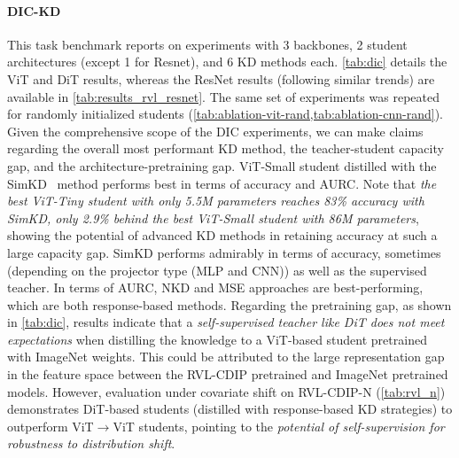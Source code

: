 \documentclass[runningheads]{llncs}
\begin{document}
\paragraph{DIC-KD} This task benchmark reports on experiments with 3 backbones, 2 student architectures (except 1 for Resnet), and 6 KD methods each. \cref{tab:dic} details the ViT and DiT results, whereas the ResNet results (following similar trends) are available in \cref{tab:results_rvl_resnet}.
The same set of experiments was repeated for randomly initialized students (\cref{tab:ablation-vit-rand,tab:ablation-cnn-rand}).
Given the comprehensive scope of the DIC experiments, we can make claims regarding the overall most performant KD method, the teacher-student capacity gap, and the architecture-pretraining gap.
ViT-Small student distilled with the SimKD~\cite{SimKD} method performs best in terms of accuracy and AURC. Note that \textit{the best ViT-Tiny student with only 5.5M parameters reaches 83\% accuracy with SimKD, only 2.9\% behind the best ViT-Small student with 86M parameters}, showing the potential of advanced KD methods in retaining accuracy at such a large capacity gap.
SimKD performs admirably in terms of accuracy, sometimes (depending on the projector type (MLP and CNN)) as well as the supervised teacher. In terms of AURC, NKD and MSE approaches are best-performing, which are both response-based methods. 
Regarding the pretraining gap, as shown in \cref{tab:dic}, results indicate that a \textit{self-supervised teacher like DiT does not meet expectations} when distilling the knowledge to a ViT-based student pretrained with ImageNet weights. This could be attributed to the large representation gap in the feature space between the RVL-CDIP pretrained and ImageNet pretrained models. However, evaluation under covariate shift on RVL-CDIP-N (\cref{tab:rvl_n}) demonstrates DiT-based students (distilled with response-based KD strategies) to outperform ViT$\to$ViT students, pointing to the \textit{potential of self-supervision for robustness to distribution shift}.
\end{document}
